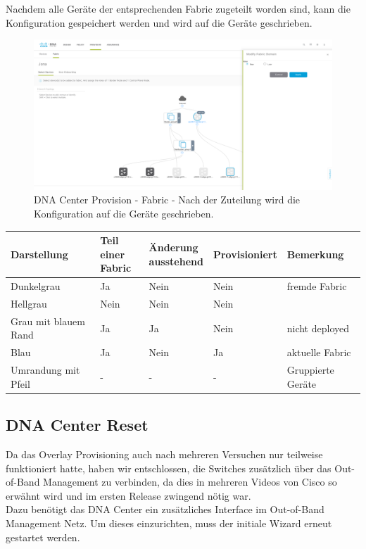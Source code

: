 Nachdem alle Geräte der entsprechenden Fabric zugeteilt worden sind, kann die Konfiguration gespeichert werden und wird auf die Geräte geschrieben. 

\begin{figure}[H]
	\centering
	\includegraphics[width=16cm]{img/dna-center-fabric-1.png}
	\caption{DNA Center Provision - Fabric - Nach der Zuteilung wird die Konfiguration auf die Geräte geschrieben.}
	\label{fig:IP Base and Services}
\end{figure}

\begin{table}[H]
	\centering
	\begin{tabular}{| l | l | l | l | l |}
		\hline
		\rowcolor{gray!50}
		\textbf{Darstellung} & \makecell{\textbf{Teil einer}\\ \textbf{Fabric}} & \makecell{\textbf{Änderung}\\ \textbf{ausstehend}} & \textbf{Provisioniert} & \textbf{Bemerkung} \\
		\hline
		Dunkelgrau & Ja & Nein & Nein & fremde Fabric \\
		\hline
		Hellgrau & Nein & Nein & Nein &  \\
		\hline
		Grau mit blauem Rand & Ja & Ja & Nein & nicht deployed\\
		\hline
		Blau & Ja & Nein & Ja & aktuelle Fabric\\
		\hline
		Umrandung mit Pfeil & - & - & - & Gruppierte Geräte\\	
		\hline
	\end{tabular}
\end{table}

\subsection{DNA Center Reset}
Da das Overlay Provisioning auch nach mehreren Versuchen nur teilweise funktioniert hatte, haben wir entschlossen, die Switches zusätzlich über das Out-of-Band Management zu verbinden, da dies in mehreren Videos von Cisco so erwähnt wird und im ersten Release zwingend nötig war. \\
Dazu benötigt das DNA Center ein zusätzliches Interface im Out-of-Band Management Netz. Um dieses einzurichten, muss der initiale Wizard erneut gestartet werden. 

